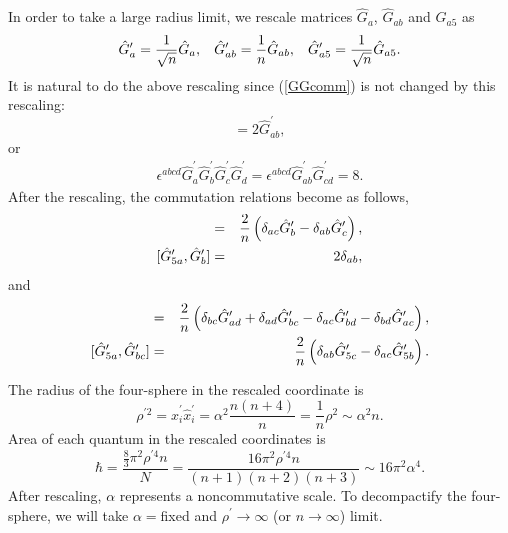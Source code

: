 \documentclass[a4paper,11pt]{article}
\begin{document}
In order to take a large radius limit, 
we rescale matrices $\hat{G}_{a}$, $\hat{G}_{ab}$ 
and $\hat{G}_{a5}$ as 
\begin{equation}
\hat{G}_{a}^{\prime}=\frac{1}{\sqrt{n}}\hat{G}_{a}, 
\hspace{0.3cm}
\hat{G}_{ab}^{\prime}=\frac{1}{n}\hat{G}_{ab}, 
\hspace{0.3cm}
\hat{G}_{a5}^{\prime}=\frac{1}{\sqrt{n}}\hat{G}_{a5}.  
\end{equation}
It is natural to do the above rescaling since 
(\ref{GGcomm}) is not changed by this rescaling: 
\begin{equation}
[\hat{G}_{a}^{\prime},\hat{G}_{b}^{\prime}]=
2\hat{G}_{ab}^{\prime}, 
\end{equation}
or 
\begin{eqnarray}
\epsilon^{abcd}\hat{G}_{a}^{\prime}\hat{G}_{b}^{\prime}
\hat{G}_{c}^{\prime}\hat{G}_{d}^{\prime}  
=\epsilon^{abcd}\hat{G}_{ab}^{\prime}\hat{G}_{cd}^{\prime}
=8. 
\label{ncplane}
\end{eqnarray}  
After the rescaling, the commutation relations become as follows, 
\begin{eqnarray}
[\hat{G}_{a}^{\prime},\hat{G}_{bc}^{\prime}]&=&\frac{2}{n}
\left(\delta_{ac}\hat{G}_{b}^{\prime}
-\delta_{ab}\hat{G}_{c}^{\prime}
 \right), \cr 
[\hat{G}_{5a}^{\prime},\hat{G}_{b}^{\prime}]
&=&2\delta_{ab}, 
\end{eqnarray}
and 
\begin{eqnarray}
[\hat{G}_{ab}^{\prime},\hat{G}_{cd}^{\prime}]&=&\frac{2}{n}\left(
\delta_{bc}\hat{G}_{ad}^{\prime}+\delta_{ad}\hat{G}_{bc}^{\prime}
-\delta_{ac}\hat{G}_{bd}^{\prime}-\delta_{bd}\hat{G}_{ac}^{\prime}
\right), \cr 
[\hat{G}_{5a}^{\prime},\hat{G}_{bc}^{\prime}]&=&\frac{2}{n}\left(
\delta_{ab}\hat{G}_{5c}^{\prime}-\delta_{ac}\hat{G}_{5b}^{\prime}
\right). 
\end{eqnarray}

The radius of the four-sphere in the rescaled coordinate is 
\begin{equation}
\rho^{\prime 2}= 
\hat{x}_{i}^{\prime}\hat{x}_{i}^{\prime}
=\alpha^{2}\frac{n(n+4)}{n}=\frac{1}{n}\rho^{2}
\sim \alpha^{2}n .
\end{equation} 
Area of each quantum in the rescaled coordinates is 
\begin{equation}
\hbar=\frac{\frac{8}{3}\pi^{2}\rho^{\prime 4} n}{N}
=\frac{16\pi^{2}\rho^{\prime 4}n}{(n+1)(n+2)(n+3)}
\sim 16\pi^{2}\alpha^{4}.
\end{equation}
After rescaling, $\alpha$ represents a noncommutative scale. 
To decompactify the four-sphere, we will take $\alpha=$fixed and 
$\rho^{\prime} \rightarrow \infty$ 
(or $n\rightarrow \infty$) limit. 
\end{document}

